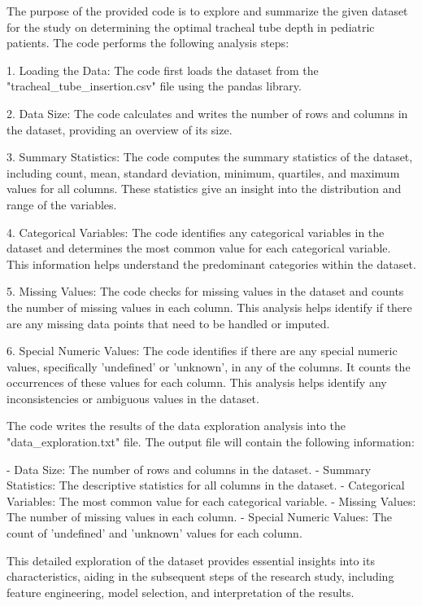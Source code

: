 \documentclass[11pt]{article}
\begin{document}
The purpose of the provided code is to explore and summarize the given dataset for the study on determining the optimal tracheal tube depth in pediatric patients. The code performs the following analysis steps:

1. Loading the Data:
   The code first loads the dataset from the "tracheal\_tube\_insertion.csv" file using the pandas library.

2. Data Size:
   The code calculates and writes the number of rows and columns in the dataset, providing an overview of its size.

3. Summary Statistics:
   The code computes the summary statistics of the dataset, including count, mean, standard deviation, minimum, quartiles, and maximum values for all columns. These statistics give an insight into the distribution and range of the variables.

4. Categorical Variables:
   The code identifies any categorical variables in the dataset and determines the most common value for each categorical variable. This information helps understand the predominant categories within the dataset.

5. Missing Values:
   The code checks for missing values in the dataset and counts the number of missing values in each column. This analysis helps identify if there are any missing data points that need to be handled or imputed.

6. Special Numeric Values:
   The code identifies if there are any special numeric values, specifically 'undefined' or 'unknown', in any of the columns. It counts the occurrences of these values for each column. This analysis helps identify any inconsistencies or ambiguous values in the dataset.

The code writes the results of the data exploration analysis into the "data\_exploration.txt" file. The output file will contain the following information:

- Data Size: The number of rows and columns in the dataset.
- Summary Statistics: The descriptive statistics for all columns in the dataset.
- Categorical Variables: The most common value for each categorical variable.
- Missing Values: The number of missing values in each column.
- Special Numeric Values: The count of 'undefined' and 'unknown' values for each column.

This detailed exploration of the dataset provides essential insights into its characteristics, aiding in the subsequent steps of the research study, including feature engineering, model selection, and interpretation of the results.
\end{document}
